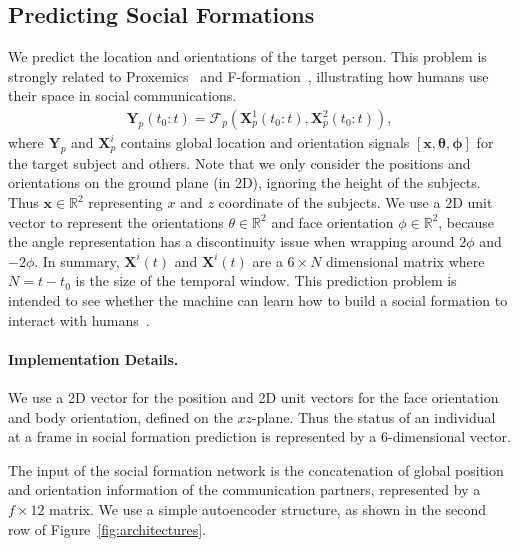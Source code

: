 \subsection{Predicting Social Formations}
We predict the location and orientations of the target person. This problem is strongly related to Proxemics~\cite{Hall66} and F-formation~\cite{kendon90}, illustrating how humans use their space in social communications.
\begin{gather}	
 \mathbf{Y}_p (t_0:t) = \mathcal{F}_p \left( \mathbf{X}_p^1(t_0:t), \mathbf{X}_p^2(t_0:t) \right),
 \label{eq:pred_formation}
\end{gather}
where $\mathbf{Y}_p$ and $\mathbf{X}_p^i$ contains global location and orientation signals $[\mathbf{x}, \boldsymbol{\theta}, \boldsymbol{\phi} ]$ for the target subject and others.
Note that we only consider the positions and orientations on the ground plane (in 2D), ignoring the height of the subjects. Thus $\mathbf{x} \in \mathbb{R}^2 $ representing $x$ and $z$ coordinate of the subjects. We use a 2D unit vector to represent the orientations $\theta \in \mathbb {R}^2$ and face orientation $\phi \in \mathbb{R}^2$, because the angle representation has a discontinuity issue when wrapping around $2\phi$ and $-2\phi$. In summary, $\mathbf{X}^i(t)$ and $\mathbf{X}^i(t)$ are a $6 \times N$ dimensional matrix where $N = t- t_0$ is the size of the temporal window. This prediction problem is intended to see whether the machine can learn how to build a social formation to interact with humans~\cite{vazquez2017towards}. %


\paragraph{Implementation Details.}
We use a 2D vector for the position and 2D unit vectors for the face orientation and body orientation, defined on the $xz$-plane. Thus the status of an individual at a frame in social formation prediction is represented by a 6-dimensional vector.


The input of the social formation network is the concatenation of global position and orientation information of the communication partners, represented by a $f \times 12$ matrix.  We use a simple autoencoder structure, as shown in the second row of Figure~\ref{fig:architectures}.


